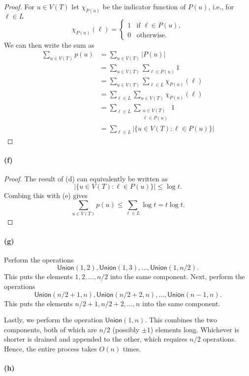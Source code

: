 \documentclass[12pt]{article}
\newcommand{\pnum}[1]{\paragraph{#1}}
\theoremstyle{definition}
\newcommand{\<}{\langle}
\renewcommand{\>}{\rangle}
\begin{document}
\begin{proof}
    For $u \in V(T)$ let $\chi_{P(u)}$ be the indicator function of $P(u)$, i.e., for $\ell \in L$
    \[
        \chi_{P(u)}(\ell) = \begin{cases}
            1 &\text{if } \ell \in P(u), \\
            0 &\text{otherwise}.
        \end{cases}
    \]
    We can then write the sum as
    \begin{align*}
        \sum_{u \in V(T)}p(u)
            &= \sum_{u \in V(T)} |P(u)| \\
            &= \sum_{u \in V(T)} \sum_{\ell \in P(u)} 1 \\
            &= \sum_{u \in V(T)} \sum_{\ell \in L} \chi_{P(u)}(\ell) \\
            &= \sum_{\ell \in L} \sum_{u \in V(T)} \chi_{P(u)}(\ell) \\
            &= \sum_{\ell \in L} \sum_{\substack{u \in V(T) \\ \ell \in P(u)}} 1 \\
            &= \sum_{\ell \in L} |\{u \in V(T) : \ell \in P(u)\}|
    \end{align*}
\end{proof}

\pnum{(f)}

\begin{proof}
    The result of (d) can equivalently be written as
    \[
        |\{u \in V(T) : \ell \in P(u)\}| \leq \log t.
    \]
    Combing this with (e) gives
    \[
        \sum_{u \in V(T)} p(u)
            \leq \sum_{\ell \in L} \log t
            = t \log t.
    \]
\end{proof}


\pnum{(g)}

Perform the operations
\[
    \mathsf{Union}(1, 2), \mathsf{Union}(1, 3), \dots, \mathsf{Union}(1, n/2).
\]
This puts the elements $1, 2, \dots, n/2$ into the same component.
Next, perform the operations
\[
    \mathsf{Union}(n/2 + 1, n), \mathsf{Union}(n/2 + 2, n), \dots, \mathsf{Union}(n-1, n).
\]
This puts the elements $n/2 + 1, n/2 + 2, \dots, n$ into the same component.

Lastly, we perform the operation $\mathsf{Union}(1, n)$.
This combines the two components, both of which are $n/2$ (possibly $\pm1$) elements long.
Whichever is shorter is drained and appended to the other, which requires $n/2$ operations.
Hence, the entire process takes $O(n)$ times.

\pnum{(h)}
\end{document}
